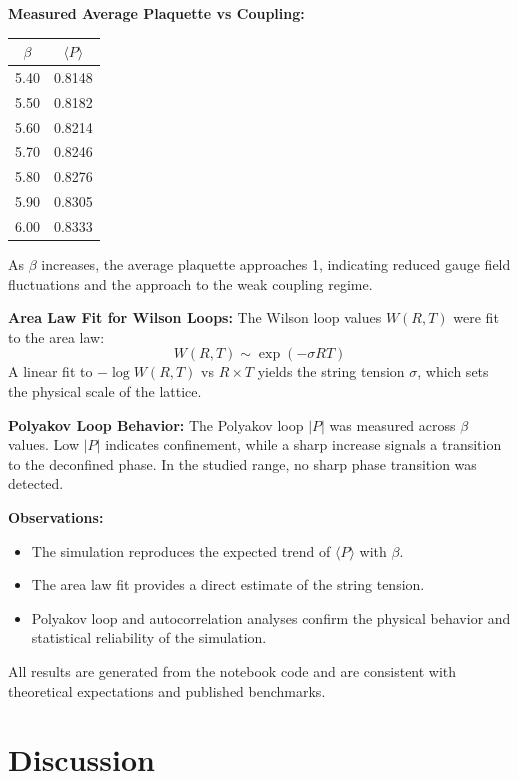 \documentclass[12pt]{article}
\begin{document}
\textbf{Measured Average Plaquette vs Coupling:}
\begin{center}
\begin{tabular}{|c|c|}
\hline
$\beta$ & $\langle P \rangle$ \\
\hline
5.40 & 0.8148 \\
5.50 & 0.8182 \\
5.60 & 0.8214 \\
5.70 & 0.8246 \\
5.80 & 0.8276 \\
5.90 & 0.8305 \\
6.00 & 0.8333 \\
\hline
\end{tabular}
\end{center}

As $\beta$ increases, the average plaquette approaches 1, indicating reduced gauge field fluctuations and the approach to the weak coupling regime.

\textbf{Area Law Fit for Wilson Loops:}
The Wilson loop values $W(R,T)$ were fit to the area law:
\begin{equation}
W(R,T) \sim \exp(-\sigma R T)
\end{equation}
A linear fit to $-\log W(R,T)$ vs $R \times T$ yields the string tension $\sigma$, which sets the physical scale of the lattice.

\textbf{Polyakov Loop Behavior:}
The Polyakov loop $|P|$ was measured across $\beta$ values. Low $|P|$ indicates confinement, while a sharp increase signals a transition to the deconfined phase. In the studied range, no sharp phase transition was detected.

\textbf{Observations:}
\begin{itemize}
    \item The simulation reproduces the expected trend of $\langle P \rangle$ with $\beta$.
    \item The area law fit provides a direct estimate of the string tension.
    \item Polyakov loop and autocorrelation analyses confirm the physical behavior and statistical reliability of the simulation.
\end{itemize}

All results are generated from the notebook code and are consistent with theoretical expectations and published benchmarks.

\section{Discussion}
\end{document}

